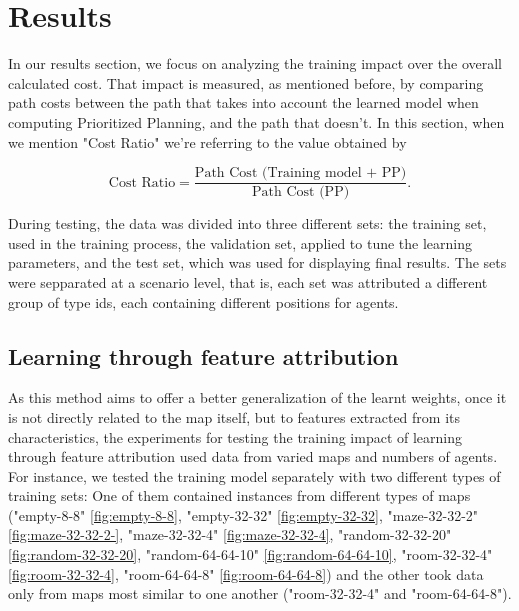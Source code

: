 \section{Results}

In our results section, we focus on analyzing the training impact over the overall calculated cost. That impact is measured, as mentioned before, by comparing path costs between the path that takes into account the learned model when computing Prioritized Planning, and the path that doesn't. In this section, when we mention "Cost Ratio" we're referring to the value obtained by

\[
\text{Cost Ratio} = \frac{\text{Path Cost (Training model + PP)}}{\text{Path Cost (PP)}}. \tag{21}
\]

During testing, the data was divided into three different sets: the training set, used in the training process, the validation set, applied to tune the learning parameters, and the test set, which was used for displaying final results. The sets were sepparated at a scenario level, that is, each set was attributed a different group of type ids, each containing different positions for agents.

\subsection{Learning through feature attribution}

As this method aims to offer a better generalization of the learnt weights, once it is not directly related to the map itself, but to features extracted from its characteristics, the experiments for testing the training impact of learning through feature attribution used data from varied maps and numbers of agents. For instance, we tested the training model separately with two different types of training sets: One of them contained instances from different types of maps ("empty-8-8" \ref{fig:empty-8-8}, "empty-32-32" \ref{fig:empty-32-32}, "maze-32-32-2" \ref{fig:maze-32-32-2-}, "maze-32-32-4" \ref{fig:maze-32-32-4}, "random-32-32-20" \ref{fig:random-32-32-20}, "random-64-64-10" \ref{fig:random-64-64-10}, "room-32-32-4" \ref{fig:room-32-32-4}, "room-64-64-8" \ref{fig:room-64-64-8}) and the other took data only from maps most similar to one another ("room-32-32-4" and "room-64-64-8").

